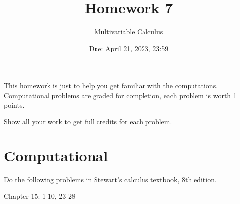 \documentclass[12pt]{article}
\title{Homework 7}
\author{ Multivariable Calculus}
\date{Due: April 21, 2023, 23:59}
\theoremstyle{definition}
\begin{document}
\maketitle

This homework is just to help you get familiar with the computations. 
Computational problems are graded for completion, each problem is worth 1 points.


Show all your work to get full credits for each problem.
\section{Computational}
Do the following problems in Stewart's calculus textbook, 8th edition.

Chapter 15: 1-10, 23-28





%
\end{document}
